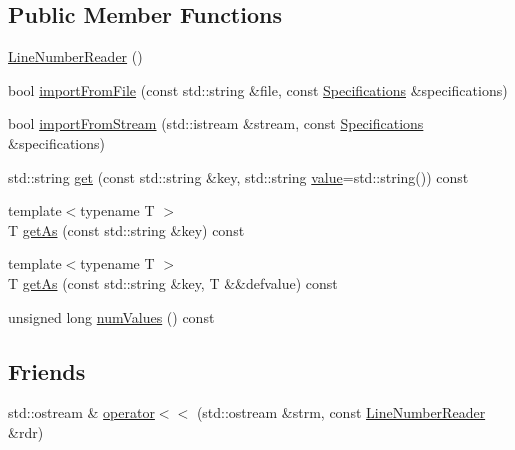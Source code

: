 \subsection*{Public Member Functions}
\begin{DoxyCompactItemize}
\item 
\mbox{\hyperlink{classdisplace_1_1formats_1_1helpers_1_1_line_number_reader_ab1a3f0f8e0685832ded3fbcc516bfe4c}{Line\+Number\+Reader}} ()
\item 
bool \mbox{\hyperlink{classdisplace_1_1formats_1_1helpers_1_1_line_number_reader_a14d53de93702af2a83e196b0ddd1413b}{import\+From\+File}} (const std\+::string \&file, const \mbox{\hyperlink{classdisplace_1_1formats_1_1helpers_1_1_line_number_reader_abe3e6baa5d73748c82d6c428e157e4b2}{Specifications}} \&specifications)
\item 
bool \mbox{\hyperlink{classdisplace_1_1formats_1_1helpers_1_1_line_number_reader_a27daa18bbc3123efe8f762ea9a06e621}{import\+From\+Stream}} (std\+::istream \&stream, const \mbox{\hyperlink{classdisplace_1_1formats_1_1helpers_1_1_line_number_reader_abe3e6baa5d73748c82d6c428e157e4b2}{Specifications}} \&specifications)
\item 
std\+::string \mbox{\hyperlink{classdisplace_1_1formats_1_1helpers_1_1_line_number_reader_a782ec24c723fc54d31b571dd510b564c}{get}} (const std\+::string \&key, std\+::string \mbox{\hyperlink{diffusion_8cpp_a4b41795815d9f3d03abfc739e666d5da}{value}}=std\+::string()) const
\item 
{\footnotesize template$<$typename T $>$ }\\T \mbox{\hyperlink{classdisplace_1_1formats_1_1helpers_1_1_line_number_reader_a62f2b6cfe881ec3dc782fd825fe11fca}{get\+As}} (const std\+::string \&key) const
\item 
{\footnotesize template$<$typename T $>$ }\\T \mbox{\hyperlink{classdisplace_1_1formats_1_1helpers_1_1_line_number_reader_a637d63d470d9ff80fe97a9d389a7bcf8}{get\+As}} (const std\+::string \&key, T \&\&defvalue) const
\item 
unsigned long \mbox{\hyperlink{classdisplace_1_1formats_1_1helpers_1_1_line_number_reader_a2e48ab1cc1db63c505b9fef5235019fe}{num\+Values}} () const
\end{DoxyCompactItemize}
\subsection*{Friends}
\begin{DoxyCompactItemize}
\item 
std\+::ostream \& \mbox{\hyperlink{classdisplace_1_1formats_1_1helpers_1_1_line_number_reader_aaf1f7910c711e89433025972c4dae158}{operator$<$$<$}} (std\+::ostream \&strm, const \mbox{\hyperlink{classdisplace_1_1formats_1_1helpers_1_1_line_number_reader}{Line\+Number\+Reader}} \&rdr)
\end{DoxyCompactItemize}


